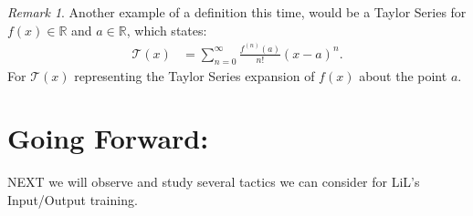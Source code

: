 \documentclass[10pt]{article}
\theoremstyle{plain}
\theoremstyle{definition}
\theoremstyle{remark}
\newtheorem{remark}[theorem]{Remark}
\begin{document}
\begin{remark}
	Another example of a definition this time, would be a Taylor Series for $f(x) \in \mathbb{R}$ and $a \in \mathbb{R}$, which states:
	\begin{align*}
		\mathcal{T}(x) &= \sum_{n=0}^{\infty} \frac{f^{(n)}(a)}{n!} (x-a)^n.
	\end{align*}
	For $\mathcal{T}(x)$ representing the Taylor Series expansion of $f(x)$ about the point $a$.
\end{remark}

\section{Going Forward:}

\lettrine[lines=1, lhang=0.1, loversize=0.2]{N}EXT we will observe and study several tactics we can consider for LiL's Input/Output training.

\nocite{*}



\end{document}
